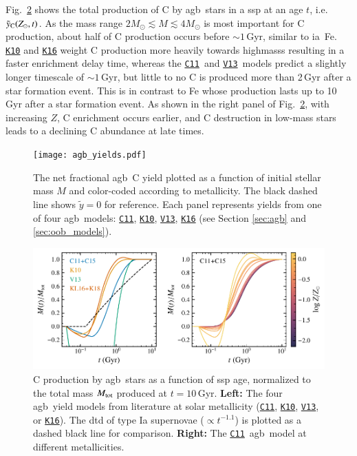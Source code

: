 \documentclass[12pt,oneside,letterpaper]{report}
\newcommand{\agb}{\gls{agb}}
\newcommand{\ia}{\gls{ia}}
\newcommand{\ssp}{\gls{ssp}}
\newcommand{\cxi}{\texttt{\hyperlink{C11}{C11}}}
\newcommand{\kx}{\texttt{\hyperlink{K10}{K10}}}
\newcommand{\kxvi}{\texttt{\hyperlink{K16}{K16}}}
\newcommand{\vxiii}{\texttt{\hyperlink{V13}{V13}}}
\newcommand{\about}[1]{${\sim} #1$}
\begin{document}
Fig.~\ref{fig:agb-ssp} shows the total production of C by \agb\ stars in a \ssp{} at an age $t$, i.e. $\tilde{y}_{\rm C}(Z_\odot, t)$. 
As the mass range $2M_\odot\lesssim M \lesssim 4M_\odot$ is most important for C production, about half of C production occurs before \about{1}\,Gyr, similar to \ia\ Fe. 
\kx{} and \kxvi{} weight C production more heavily towards \glspl{highmass} resulting in a faster enrichment delay time, whereas the \cxi\ and \vxiii\ models predict a slightly longer timescale of \about{1}\,Gyr, but little to no C is produced more than 2\,Gyr after a star formation event. This is in contrast to Fe whose production lasts up to 10\,Gyr after a star formation event. As shown in the right panel of Fig.~\ref{fig:agb-ssp}, with increasing $Z$, C enrichment occurs earlier, and C destruction in low-mass stars leads to a declining C abundance at late times.
    

\begin{figure}[htp]
    \centering
 	    \texttt{[image: agb\_yields.pdf]}
        \caption[Low-Mass Stellar Carbon Yields]{The net fractional \agb\ C yield  plotted as a function of initial stellar mass $M$ and color-coded according to metallicity. The black dashed line shows $\tilde{y}=0$ for reference. Each panel represents yields from one of four \agb\ models: \cxi, \kx{}, \vxiii{}, \kxvi{} (see Section \ref{sec:agb} and \ref{sec:oob_models}). }
        \label{fig:y_agb}
\end{figure}
\begin{figure}[htp]
    \centering
    \includegraphics[scale=1]{y_agb_t2.pdf}

    \caption[Carbon Delay Time Distribution]{
    C production by \agb\ stars as a function of \ssp{} age, normalized to the total mass $M_{\rm tot}$ produced at $t=10$\,Gyr. \textbf{Left:} The four \agb\ yield models from literature at solar metallicity (\cxi, \kx{}, \vxiii{}, or \kxvi{}). The \gls{dtd} of type Ia supernovae ($\propto t^{-1.1}$) is plotted as a dashed black line for comparison. \textbf{Right:} The \cxi\ \agb\ model at different metallicities. }
    \label{fig:agb-ssp}
\end{figure}
\end{document}
